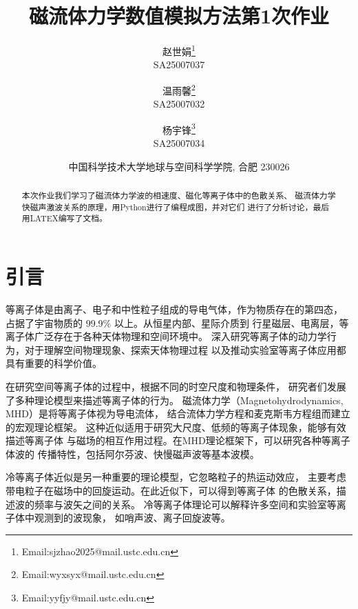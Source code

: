 \documentclass{article}
\begin{document}
\renewcommand{\refname}{参考文献}
\renewcommand{\figurename}{图}
\renewcommand{\abstractname}{摘要}

\title{磁流体力学数值模拟方法第1次作业}


\author{赵世娟\footnote{Email:sjzhao2025@mail.ustc.edu.cn}\\SA25007037
  \and
  温雨馨\footnote{Email:wyxsyx@mail.ustc.edu.cn}\\SA25007032
\and
 杨宇锋\footnote{Email:yyfjy@mail.ustc.edu.cn}\\SA25007034
}

\date{%
\scriptsize%
中国科学技术大学地球与空间科学学院, 合肥 230026
%
}

\maketitle

\begin{abstract}
本次作业我们学习了磁流体力学波的相速度、磁化等离子体中的色散关系、
磁流体力学快磁声激波关系的原理，用Python进行了编程成图，并对它们
进行了分析讨论，最后用LATEX编写了文档。
\end{abstract}

\section{引言}
等离子体是由离子、电子和中性粒子组成的导电气体，作为物质存在的第四态，
占据了宇宙物质的 99.9\% 以上\citep{Diver2001}。从恒星内部、星际介质到
行星磁层、电离层，等离子体广泛存在于各种天体物理和空间环境中。
深入研究等离子体的动力学行为，对于理解空间物理现象、探索天体物理过程
以及推动实验室等离子体应用都具有重要的科学价值。

在研究空间等离子体的过程中，根据不同的时空尺度和物理条件，
研究者们发展了多种理论模型来描述等离子体的行为。
磁流体力学（Magnetohydrodynamics, MHD）是将等离子体视为导电流体，
结合流体力学方程和麦克斯韦方程组而建立的宏观理论框架\citep{Jeffrey1964}。
这种近似适用于研究大尺度、低频的等离子体现象，能够有效描述等离子体
与磁场的相互作用过程。在MHD理论框架下，可以研究各种等离子体波的
传播特性，包括阿尔芬波、快慢磁声波等基本波模。

冷等离子体近似是另一种重要的理论模型，它忽略粒子的热运动效应，
主要考虑带电粒子在磁场中的回旋运动。在此近似下，可以得到等离子体
的色散关系，描述波的频率与波矢之间的关系\citep{Diver2001}。
冷等离子体理论可以解释许多空间和实验室等离子体中观测到的波现象，
如哨声波、离子回旋波等。
\end{document}
